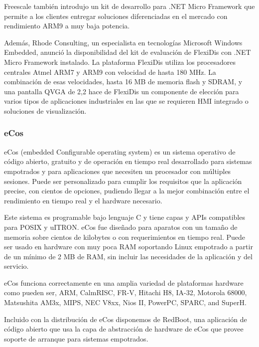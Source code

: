 Freescale también introdujo un kit de desarrollo para .NET Micro Framework que permite a los clientes entregar soluciones diferenciadas en el mercado con rendimiento ARM9 a muy baja potencia.



Además, Rhode Consulting, un especialista en tecnologías Microsoft Windows Embedded, anunció la disponibilidad del kit de evaluación de FlexiDis con .NET Micro Framework instalado. La plataforma FlexiDis utiliza los procesadores centrales Atmel ARM7 y ARM9 con velocidad de hasta 180 MHz. La combinación de esas velocidades, hasta 16 MB de memoria flash y SDRAM, y una pantalla QVGA de 2,2 hace de FlexiDis un componente de elección para varios tipos de aplicaciones industriales en las que se requieren HMI integrado o soluciones de visualización.




\subsubsection{eCos}
eCos (embedded Configurable operating system) es un sistema operativo de código abierto, gratuito y de operación en tiempo real desarrollado para sistemas empotrados y para aplicaciones que necesiten un procesador con múltiples sesiones. Puede ser personalizado para cumplir los requisitos que la aplicación precise, con cientos de opciones, pudiendo llegar a la mejor combinación entre el rendimiento en tiempo real y el hardware necesario.



Este sistema es programable bajo lenguaje C y tiene capas y APIs compatibles para POSIX y uITRON. eCos fue diseñado para aparatos con un tamaño de memoria sobre cientos de kilobytes o con requerimientos en tiempo real. Puede ser usado en hardware con muy poca RAM soportando Linux empotrado a partir de un mínimo de 2 MB de RAM, sin incluir las necesidades de la aplicación y del servicio.




eCos funciona correctamente en una amplia variedad de plataformas hardware como pueden ser, ARM, CalmRISC, FR-V, Hitachi H8, IA-32, Motorola 68000, Matsushita AM3x, MIPS, NEC V8xx, Nios II, PowerPC, SPARC, and SuperH.



Incluido con la distribución de eCos disponemos de RedBoot, una aplicación de código abierto que usa la capa de abstracción de hardware de eCos que provee soporte de arranque para sistemas empotrados.



